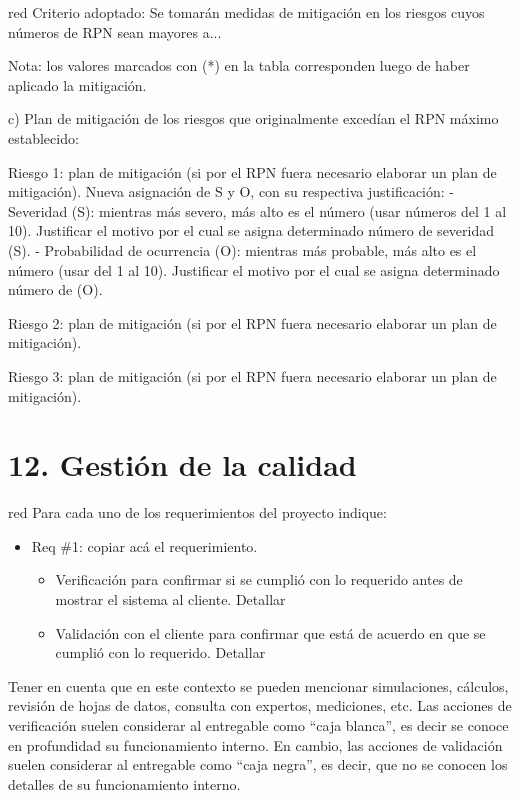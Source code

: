 \documentclass[
11pt, %
]{charter}
\begin{document}
\begin{consigna}{red}
Criterio adoptado: 
Se tomarán medidas de mitigación en los riesgos cuyos números de RPN sean mayores a...

Nota: los valores marcados con (*) en la tabla corresponden luego de haber aplicado la mitigación.

c) Plan de mitigación de los riesgos que originalmente excedían el RPN máximo establecido:
 
Riesgo 1: plan de mitigación (si por el RPN fuera necesario elaborar un plan de mitigación).
  Nueva asignación de S y O, con su respectiva justificación:
  - Severidad (S): mientras más severo, más alto es el número (usar números del 1 al 10).
          Justificar el motivo por el cual se asigna determinado número de severidad (S).
  - Probabilidad de ocurrencia (O): mientras más probable, más alto es el número (usar del 1 al 10).
          Justificar el motivo por el cual se asigna determinado número de (O).

Riesgo 2: plan de mitigación (si por el RPN fuera necesario elaborar un plan de mitigación).
 
Riesgo 3: plan de mitigación (si por el RPN fuera necesario elaborar un plan de mitigación).

\end{consigna}


\section{12. Gestión de la calidad}
\label{sec:calidad}

\begin{consigna}{red}
Para cada uno de los requerimientos del proyecto indique:
\begin{itemize} 
\item Req \#1: copiar acá el requerimiento.

\begin{itemize}
	\item Verificación para confirmar si se cumplió con lo requerido antes de mostrar el sistema al cliente. Detallar 
	\item Validación con el cliente para confirmar que está de acuerdo en que se cumplió con lo requerido. Detallar  
\end{itemize}

\end{itemize}

Tener en cuenta que en este contexto se pueden mencionar simulaciones, cálculos, revisión de hojas de datos, consulta con expertos, mediciones, etc.  Las acciones de verificación suelen considerar al entregable como ``caja blanca'', es decir se conoce en profundidad su funcionamiento interno.  En cambio, las acciones de validación suelen considerar al entregable como ``caja negra'', es decir, que no se conocen los detalles de su funcionamiento interno.

\end{consigna}
\end{document}
